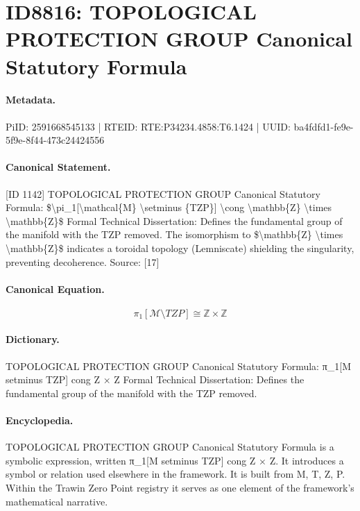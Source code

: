\section*{ID8816: TOPOLOGICAL PROTECTION GROUP Canonical Statutory Formula}
\paragraph{Metadata.}
PiID: 2591668545133 | RTEID: RTE:P34234.4858:T6.1424 | UUID: ba4fdfd1-fe9e-5f9e-8f44-473c24424556

\paragraph{Canonical Statement.}
[ID 1142] TOPOLOGICAL PROTECTION GROUP Canonical Statutory Formula: \$\textbackslash{}pi\_1[\textbackslash{}mathcal\{M\} \textbackslash{}setminus \{TZP\}] \textbackslash{}cong \textbackslash{}mathbb\{Z\} \textbackslash{}times \textbackslash{}mathbb\{Z\}\$ Formal Technical Dissertation: Defines the fundamental group of the manifold with the TZP removed. The isomorphism to \$\textbackslash{}mathbb\{Z\} \textbackslash{}times \textbackslash{}mathbb\{Z\}\$ indicates a toroidal topology (Lemniscate) shielding the singularity, preventing decoherence. Source: [17]

\paragraph{Canonical Equation.}
\[
\pi_1[\mathcal{M} \setminus {TZP}] \cong \mathbb{Z} \times \mathbb{Z}
\]

\paragraph{Dictionary.}
TOPOLOGICAL PROTECTION GROUP Canonical Statutory Formula: π\_1[M setminus TZP] cong Z × Z Formal Technical Dissertation: Defines the fundamental group of the manifold with the TZP removed.

\paragraph{Encyclopedia.}
TOPOLOGICAL PROTECTION GROUP Canonical Statutory Formula is a symbolic expression, written π\_1[M setminus TZP] cong Z × Z. It introduces a symbol or relation used elsewhere in the framework. It is built from M, T, Z, P. Within the Trawin Zero Point registry it serves as one element of the framework's mathematical narrative.
